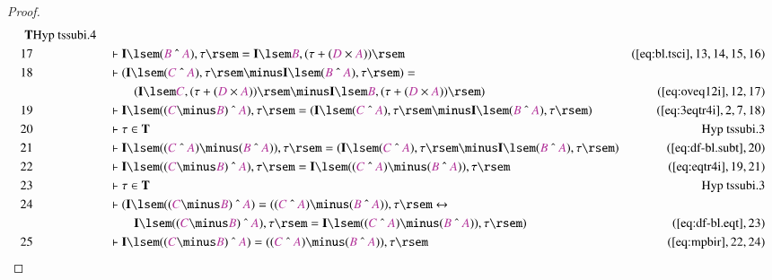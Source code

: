 \begin{proof}
\begin{align}
      \mathbf{T}&\text{Hyp~tssubi.4}\notag%
  \\ 17 &&  & \vdash \mathbf{I} \lsem ( \mc{B} ~\string^~ \mc{A} ) , \tau \rsem
      = \mathbf{I} \lsem \mc{B} , ( \tau + ( \mc{D} \times
      \mc{A} ) )
      \rsem&(\mbox{\ref{eq:bl.tsci}},13,14,15,16)\notag
  \\ 18 &&  & \vdash ( \mathbf{I} \lsem ( \mc{C} ~\string^~ \mc{A} ) , \tau
      \rsem \minus \mathbf{I} \lsem ( \mc{B} ~\string^~
      \mc{A} ) , \tau \rsem ) =  \notag \\ & & & \qquad
     ( \mathbf{I} \lsem \mc{C} ,
      ( \tau + ( \mc{D} \times \mc{A} ) ) \rsem \minus
      \mathbf{I} \lsem \mc{B} , ( \tau + ( \mc{D} \times
      \mc{A} ) ) \rsem
      )&(\mbox{\ref{eq:oveq12i}},12,17)\notag
  \\ 19 &&  & \vdash \mathbf{I} \lsem ( ( \mc{C} \minus \mc{B} ) ~\string^~
      \mc{A} ) , \tau \rsem = ( \mathbf{I} \lsem ( \mc{C}
      ~\string^~ \mc{A} ) , \tau \rsem \minus \mathbf{I}
      \lsem ( \mc{B} ~\string^~ \mc{A} ) , \tau \rsem
      )&(\mbox{\ref{eq:3eqtr4i}},2,7,18)\notag
  \\ 20 &&  & \vdash \tau \in \mathbf{T}&\text{Hyp~tssubi.3}\notag%
  \\ 21 &&  & \vdash \mathbf{I} \lsem ( ( \mc{C} ~\string^~ \mc{A} ) \minus (
      \mc{B} ~\string^~ \mc{A} ) ) , \tau \rsem = (
      \mathbf{I} \lsem ( \mc{C} ~\string^~ \mc{A} ) , \tau
      \rsem \minus \mathbf{I} \lsem ( \mc{B} ~\string^~
      \mc{A} ) , \tau \rsem
      )&(\mbox{\ref{eq:df-bl.subt}},20)\notag
  \\ 22 &&  & \vdash \mathbf{I} \lsem ( ( \mc{C} \minus \mc{B} ) ~\string^~
      \mc{A} ) , \tau \rsem = \mathbf{I} \lsem ( ( \mc{C}
      ~\string^~ \mc{A} ) \minus ( \mc{B} ~\string^~ \mc{A}
      ) ) , \tau \rsem&(\mbox{\ref{eq:eqtr4i}},19,21)\notag
  \\ 23 &&  & \vdash \tau \in \mathbf{T}&\text{Hyp~tssubi.3}\notag%
  \\ 24 &&  & \vdash ( \mathbf{I} \lsem ( ( \mc{C} \minus \mc{B} ) ~\string^~
      \mc{A} ) = ( ( \mc{C} ~\string^~ \mc{A} ) \minus (
      \mc{B} ~\string^~ \mc{A} ) ) , \tau \rsem
      \leftrightarrow  \notag \\ & & & \qquad
     \mathbf{I} \lsem ( ( \mc{C} \minus
      \mc{B} ) ~\string^~ \mc{A} ) , \tau \rsem =
      \mathbf{I} \lsem ( ( \mc{C} ~\string^~ \mc{A} )
      \minus ( \mc{B} ~\string^~ \mc{A} ) ) , \tau \rsem
      )&(\mbox{\ref{eq:df-bl.eqt}},23)\notag
  \\ 25 &&  & \vdash \mathbf{I} \lsem ( ( \mc{C} \minus \mc{B} ) ~\string^~
      \mc{A} ) = ( ( \mc{C} ~\string^~ \mc{A} ) \minus (
      \mc{B} ~\string^~ \mc{A} ) ) , \tau
      \rsem&(\mbox{\ref{eq:mpbir}},22,24)\notag
\end{align}
\end{proof}

